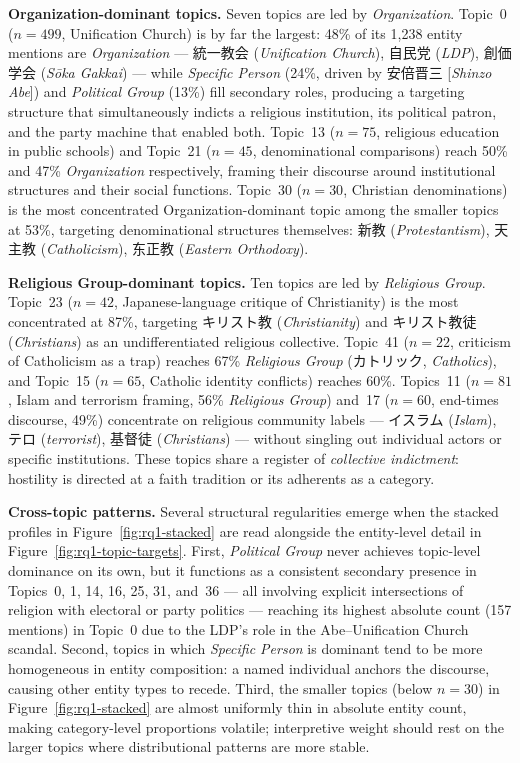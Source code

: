 \documentclass[../CLthesis.tex]{subfiles}
\begin{document}
\textbf{Organization-dominant topics.}
Seven topics are led by \textit{Organization}. Topic~0 ($n=499$, Unification Church) is by far the largest: 48\% of its 1{,}238 entity mentions are \textit{Organization} --- 統一教会 (\textit{Unification Church}), 自民党 (\textit{LDP}), 創価学会 (\textit{S\={o}ka Gakkai}) --- while \textit{Specific Person} (24\%, driven by 安倍晋三 [\textit{Shinzo Abe}]) and \textit{Political Group} (13\%) fill secondary roles, producing a targeting structure that simultaneously indicts a religious institution, its political patron, and the party machine that enabled both. Topic~13 ($n=75$, religious education in public schools) and Topic~21 ($n=45$, denominational comparisons) reach 50\% and 47\% \textit{Organization} respectively, framing their discourse around institutional structures and their social functions. Topic~30 ($n=30$, Christian denominations) is the most concentrated Organization-dominant topic among the smaller topics at 53\%, targeting denominational structures themselves: 新教 (\textit{Protestantism}), 天主教 (\textit{Catholicism}), 东正教 (\textit{Eastern Orthodoxy}).

\textbf{Religious Group-dominant topics.}
Ten topics are led by \textit{Religious Group}. Topic~23 ($n=42$, Japanese-language critique of Christianity) is the most concentrated at 87\%, targeting キリスト教 (\textit{Christianity}) and キリスト教徒 (\textit{Christians}) as an undifferentiated religious collective. Topic~41 ($n=22$, criticism of Catholicism as a trap) reaches 67\% \textit{Religious Group} (カトリック, \textit{Catholics}), and Topic~15 ($n=65$, Catholic identity conflicts) reaches 60\%. Topics~11 ($n=81$, Islam and terrorism framing, 56\% \textit{Religious Group}) and~17 ($n=60$, end-times discourse, 49\%) concentrate on religious community labels --- イスラム (\textit{Islam}), テロ (\textit{terrorist}), 基督徒 (\textit{Christians}) --- without singling out individual actors or specific institutions. These topics share a register of \textit{collective indictment}: hostility is directed at a faith tradition or its adherents as a category.

\textbf{Cross-topic patterns.}
Several structural regularities emerge when the stacked profiles in Figure~\ref{fig:rq1-stacked} are read alongside the entity-level detail in Figure~\ref{fig:rq1-topic-targets}. First, \textit{Political Group} never achieves topic-level dominance on its own, but it functions as a consistent secondary presence in Topics~0, 1, 14, 16, 25, 31, and~36 --- all involving explicit intersections of religion with electoral or party politics --- reaching its highest absolute count (157 mentions) in Topic~0 due to the LDP's role in the Abe--Unification Church scandal. Second, topics in which \textit{Specific Person} is dominant tend to be more homogeneous in entity composition: a named individual anchors the discourse, causing other entity types to recede. Third, the smaller topics (below $n=30$) in Figure~\ref{fig:rq1-stacked} are almost uniformly thin in absolute entity count, making category-level proportions volatile; interpretive weight should rest on the larger topics where distributional patterns are more stable.
\end{document}
